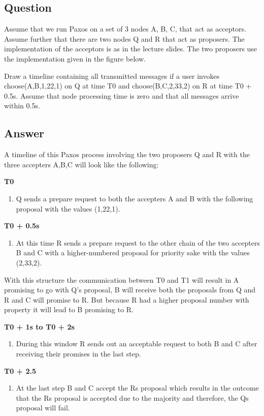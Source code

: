 \documentclass{article}
\begin{document}
\subsection*{Question}
Assume that we run Paxos on a set of 3 nodes A, B, C, that act as acceptors. Assume further that there are two nodes Q and R that act as proposers. The implementation of the acceptors is as in the lecture slides. The two proposers use the implementation given in the figure below.

Draw a timeline containing all transmitted messages if a user invokes choose(A,B,1,22,1) on Q at time T0 and choose(B,C,2,33,2) on R at time T0 + 0.5s. Assume that node processing time is zero and that all messages arrive within 0.5s.

\subsection*{Answer}
A timeline of this Paxos process involving the two proposers Q and R with the three accepters A,B,C will look like the following:

\textbf{T0}
\begin{enumerate}
    \item Q sends a prepare request to both the accepters A and B with the following proposal with the values (1,22,1).
\end{enumerate}

\textbf{T0 + 0.5s}
\begin{enumerate}
    \item At this time R sends a prepare request to the other chain of the two accepters B and C with a higher-numbered proposal for priority sake with the values (2,33,2).
\end{enumerate}

With this structure the communication between T0 and T1 will result in A promising to go with Q's proposal, B will receive both the proposals from Q and R and C will promise to R. But because R had a higher proposal number with property it will lead to B promising to R.

\textbf{T0 + 1s to T0 + 2s}
\begin{enumerate}
    \item During this window R sends out an acceptable request to both B and C after receiving their promises in the last step.
\end{enumerate}

\textbf{T0 + 2.5}
\begin{enumerate}
    \item At the last step B and C accept the Rs proposal which results in the outcome that the Rs proposal is accepted due to the majority and therefore, the Qs proposal will fail.
\end{enumerate}
\end{document}
